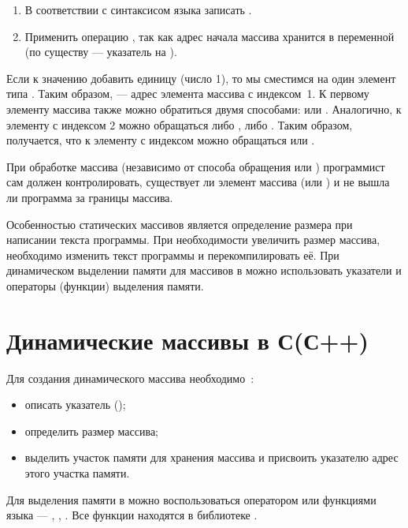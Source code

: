 \begin{enumerate}
\item В соответствии с синтаксисом языка  записать .
\item Применить операцию , так как адрес начала массива хранится в переменной  
(по существу  --- указатель на ).
\end{enumerate}

Если к значению  добавить единицу (число 1), то мы сместимся на один элемент типа .
Таким образом,  --- адрес элемента массива  с индексом~1. К
первому элементу массива  также можно обратиться двумя способами:  или
. Аналогично, к элементу с индексом 2 можно обращаться либо , либо
. Таким образом, получается, что к элементу с индексом  можно обращаться
 или . 

При обработке массива (независимо от способа обращения  или )
программист сам должен контролировать, существует ли элемент массива  (или
) и не вышла ли программа за границы массива.

Особенностью статических массивов является определение размера при написании текста программы. При
необходимости увеличить размер массива, необходимо изменить текст программы и перекомпилировать её. 
При динамическом
выделении памяти для массивов в  можно использовать указатели и операторы (функции) выделения памяти.

\section[Динамические массивы в С(С++)]{Динамические массивы в С(С++)}
Для создания динамического массива необходимо~\cite{VC++,Shim}:%

\begin{itemize}
\item описать указатель ();
\item определить размер массива;
\item выделить участок памяти для хранения массива и присвоить указателю адрес этого участка памяти.
\end{itemize}
Для выделения памяти в  можно воспользоваться оператором  или функциями языка  ---
, , . Все функции находятся в библиотеке
.


